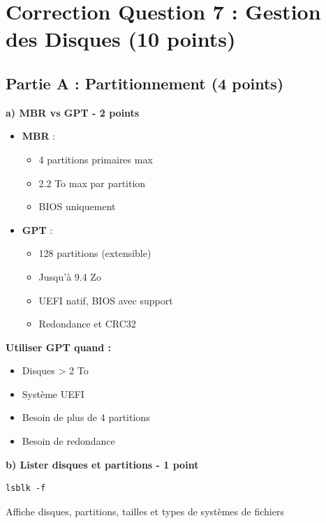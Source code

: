 \documentclass[12pt,a4paper]{article}
\begin{document}

\section{Correction Question 7 : Gestion des Disques (10 points)}

\subsection*{Partie A : Partitionnement (4 points)}

\begin{answerbox}
\textbf{a) MBR vs GPT - 2 points}

\begin{itemize}
    \item \textbf{MBR} :
    \begin{itemize}
        \item 4 partitions primaires max
        \item 2.2 To max par partition
        \item BIOS uniquement
    \end{itemize}
    \item \textbf{GPT} :
    \begin{itemize}
        \item 128 partitions (extensible)
        \item Jusqu'à 9.4 Zo
        \item UEFI natif, BIOS avec support
        \item Redondance et CRC32
    \end{itemize}
\end{itemize}

\textbf{Utiliser GPT quand :}
\begin{itemize}
    \item Disques > 2 To
    \item Système UEFI
    \item Besoin de plus de 4 partitions
    \item Besoin de redondance
\end{itemize}

\textbf{b) Lister disques et partitions - 1 point}
\begin{lstlisting}
lsblk -f
\end{lstlisting}
Affiche disques, partitions, tailles et types de systèmes de fichiers


\end{answerbox}
\end{document}
